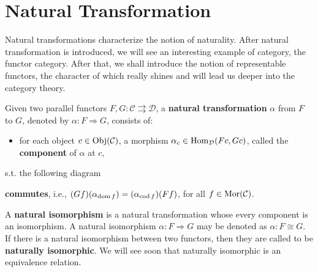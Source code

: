 \section{Natural Transformation}
Natural transformations characterize the notion of naturality. After natural transformation is introduced, we will see an interesting example of category, the functor category. After that, we shall introduce the notion of representable functors, the character of which really shines and will lead us deeper into the category theory.
	\begin{definition}
	Given two parallel functors $F,G:\mathcal{C}\rightrightarrows \mathcal{D}$, a \textbf{natural transformation} $\alpha$ from $F$ to $G$, denoted by $\alpha:F\Rightarrow G$, consists of:
		\begin{itemize}
			\item for each object $c\in\operatorname{Obj}(\mathcal{C})$, a morphism $\alpha_c\in\operatorname{Hom}_\mathcal{D}(Fc,Gc)$, called the \textbf{component} of $\alpha$ at $c$,
		\end{itemize}
		s.t. the following diagram
		\begin{center}
		\end{center}
		\textbf{commutes}, i.e., $(Gf)(\alpha_{\operatorname{dom} f})=(\alpha_{\operatorname{cod} f})(Ff)$, for all $f\in\operatorname{Mor}(\mathcal{C})$.\par
		A \textbf{natural isomorphism} is a natural transformation whose every component is an isomorphism. A natural isomorphism $\alpha:F\Rightarrow G$ may be denoted as $\alpha:F\cong G$. If there is a natural isomorphism between two functors, then they are called to be \textbf{naturally isomorphic}. We will see soon that naturally isomorphic is an equivalence relation.
	\end{definition}
